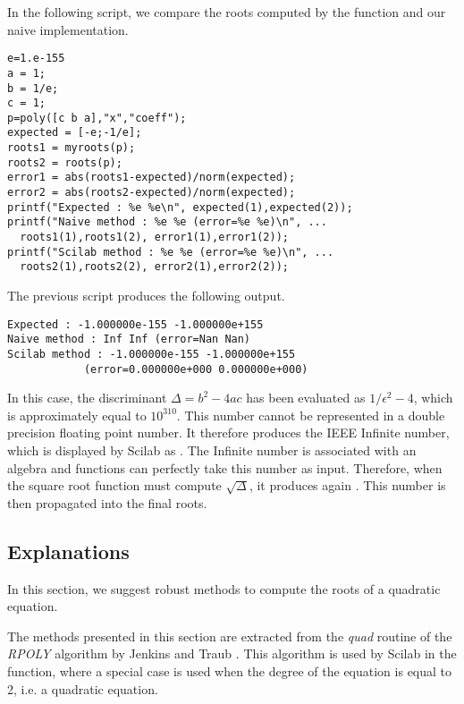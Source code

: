 In the following script, we compare the roots computed by the 
function and our naive implementation.
\lstset{language=scilabscript}
\begin{lstlisting}
e=1.e-155
a = 1;
b = 1/e;
c = 1;
p=poly([c b a],"x","coeff");
expected = [-e;-1/e];
roots1 = myroots(p);
roots2 = roots(p);
error1 = abs(roots1-expected)/norm(expected);
error2 = abs(roots2-expected)/norm(expected);
printf("Expected : %e %e\n", expected(1),expected(2));
printf("Naive method : %e %e (error=%e %e)\n", ...
  roots1(1),roots1(2), error1(1),error1(2));
printf("Scilab method : %e %e (error=%e %e)\n", ...
  roots2(1),roots2(2), error2(1),error2(2));
\end{lstlisting}

The previous script produces the following output.
\begin{lstlisting}
Expected : -1.000000e-155 -1.000000e+155
Naive method : Inf Inf (error=Nan Nan)
Scilab method : -1.000000e-155 -1.000000e+155 
            (error=0.000000e+000 0.000000e+000)
\end{lstlisting}

In this case, the discriminant $\Delta = b^2-4ac$ has been evaluated as $1/\epsilon^2-4$,
which is approximately equal to $10^{310}$. This number cannot 
be represented in a double precision floating point number. It therefore produces the 
IEEE Infinite number, which is displayed by Scilab as .
The Infinite number is associated with an algebra and functions can perfectly 
take this number as input. Therefore, when the square root function 
must compute $\sqrt{\Delta}$, it produces again . This number is 
then propagated into the final roots.

\subsection{Explanations}

In this section, we suggest robust methods to compute the roots of a 
quadratic equation. 

The methods presented in this section are extracted from the 
\emph{quad} routine of the \emph{RPOLY} algorithm by
Jenkins and Traub \cite{JenkinsTraub1970,Jenkins1975}. This algorithm is used by Scilab in the 
 function, where a special case is used when the 
degree of the equation is equal to 2, i.e. a quadratic equation.

